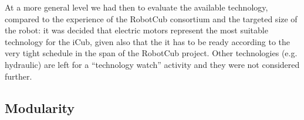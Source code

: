 At a more general level we had then to evaluate the available technology, compared 
to the experience of the RobotCub consortium and the targeted size of the robot: 
it was decided that electric motors represent the most suitable technology for 
the iCub, given also that the it has to be ready according to the very 
tight schedule in the span of the RobotCub project. Other technologies 
(e.g. hydraulic) are left for a ``technology watch'' activity and they were 
not considered further.





\subsection{Modularity}




